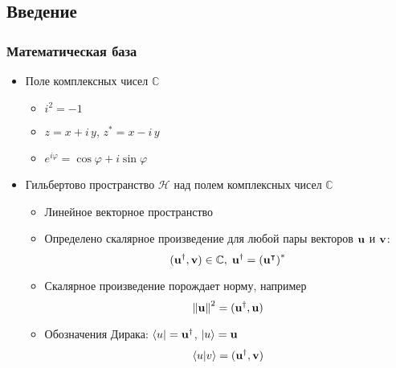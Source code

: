 \subsection{Введение}
\begin{frame}
    \frametitle{Математическая база}
    \begin{itemize}[<+->]
    \item
        Поле комплексных чисел $\mathbb{C}$
        \begin{itemize}[<+->]
        \item $i^2 = -1$
        \item $z = x + i\,y$, $z^\ast = x - i\, y$
        \item $e^{i \varphi} = \cos \varphi + i \sin \varphi$
        \end{itemize}
    \item
        Гильбертово пространство $\mathcal{H}$
        над полем комплексных чисел $\mathbb{C}$
        \begin{itemize}[<+->]
        \item Линейное векторное пространство
        \item
            Определено скалярное произведение для любой пары
            векторов $\bf{u}$ и $\bf{v}$:
            $$(\bf{u}^\dagger, \bf{v}) \in \mathbb{C},\;
            \bf{u}^\dagger = \left(\bf{u}^\intercal \right)^\ast$$
        \item
            Скалярное произведение порождает норму, например
            $$\left\lVert\bf{u}\right\rVert^2 = (\bf {u}^\dagger, \bf{u})$$
        \item Обозначения Дирака:
        $\bra{u} = \bf{u}^\dagger$, $\ket{u} = \bf{u}$
        $$\braket{u|v} = (\bf{u}^\dagger, \bf{v})$$
        \end{itemize}
    \end{itemize}
\end{frame}
